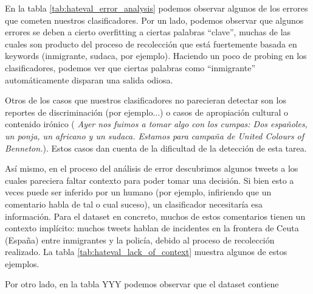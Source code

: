 En la tabla \ref{tab:hateval_error_analysis} podemos observar algunos de los errores que cometen nuestros clasificadores. Por un lado, podemos observar que algunos errores se deben a cierto overfitting a ciertas palabras ``clave'', muchas de las cuales son producto del proceso de recolección que está fuertemente basada en keywords (inmigrante, sudaca, por ejemplo). Haciendo un poco de probing en los clasificadores, podemos ver que ciertas palabras como ``inmigrante'' automáticamente disparan una salida odiosa.

Otros de los casos que nuestros clasificadores no parecieran detectar son los reportes de discriminación (por ejemplo...) o casos de apropiación cultural o contenido irónico (\emph{ Ayer nos fuimos a tomar algo con los cumpas: Dos españoles, un ponja, un africano y un sudaca. Estamos para campaña de United Colours of Benneton.}). Estos casos dan cuenta de la dificultad de la detección de esta tarea.

Así mismo, en el proceso del análisis de error descubrimos algunos tweets a los cuales pareciera faltar contexto para poder tomar una decisión. Si bien esto a veces puede ser inferido por un humano (por ejemplo, infiriendo que un comentario habla de tal o cual suceso), un clasificador necesitaría esa información. Para el dataset en concreto, muchos de estos comentarios tienen un contexto implícito: muchos tweets hablan de incidentes en la frontera de Ceuta (España) entre inmigrantes y la policía, debido al proceso de recolección realizado. La tabla \ref{tab:hateval_lack_of_context} muestra algunos de estos ejemplos.


Por otro lado, en la tabla YYY podemos observar que el dataset contiene



